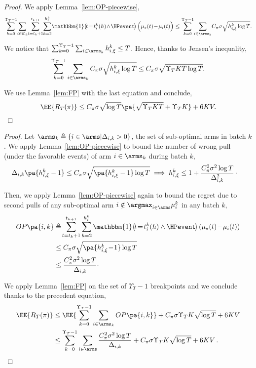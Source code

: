 \begin{tBox}\restapiecewisetheorem*
\end{tBox}
\begin{proof}

We apply Lemma~\ref{lem:OP-piecewise},
\[\sum_{k=0}^{\Upsilon_T-1} \! \sum_{i \in \mathcal{K}_{k}} \!\sum_{t=t_{k}+1}^{t_{k+1}} \! \sum_{h=2}^{h_{i}^{k}} \!\mathbbm{1}\!\left( \!t\!=\!t_{i}^{k}(h)\!\land\!\HPevent\!\right)\Big(\mu_{\star}(t)\!-\!\mu_{i}(t)\Big) \leq  \sum_{k=0}^{\Upsilon_T-1} \!\sum_{i\in\arms_k}\!  C_\pi \sigma \sqrt{h_{i,\xi}^k\log{T}} .\]

We notice that $ \sum_{k=0}^{\Upsilon_T -1}\sum_{i\in\arms_k} h_{i,\xi}^k\leq T$. Hence, thanks to Jensen's inequality, 
\[
\sum_{k=0}^{\Upsilon_T-1} \sum_{i\in\arms_k} C_\pi\sigma \sqrt{h_{i,\xi}^k\log{T}} \leq  C_\pi \sigma \sqrt{ \Upsilon_T K T\log{T}}.
\]

We use Lemma~\ref{lem:FP} with the last equation and conclude,
\[
\EE{R_T(\pi)} \leq C_\pi \sigma \sqrt{\log{T}} \pa{ \sqrt{\Upsilon_T KT} + \Upsilon_T K} + 6KV.
\]
\end{proof}
\begin{tBox}
\restapiecewisetheorempd*
\end{tBox}
\begin{proof}
Let $\arms_k \triangleq \left\{ i \in \arms | \Delta_{i,k} > 0\right\}$, the set of sub-optimal arms in batch $k$.
We apply Lemma~\ref{lem:OP-piecewise} to bound the number of wrong pull (under the favorable events) of arm $i\in \arms_k$ during batch $k$,
\begin{align*}
     \Delta_{i,k} \pa{h^k_{i, \xi} -1} & \leq C_\pi \sigma \sqrt{\pa{h_{i,\xi}^k-1}\log{T}} \implies h_{i,\xi}^k \leq 1 + \frac{C_\pi^2 \sigma^2\log{T}}{\Delta_{i,k}^2}\, \cdot
\end{align*}

Then, we apply Lemma~\ref{lem:OP-piecewise} again to bound the regret due to second pulls of any sub-optimal arm $i\notin \argmax_{i \in \arms} \mu_i^k$ in any batch $k$,
\begin{align*}
OP\pa{i,k} &\triangleq\! \sum_{t=t_{k}+1}^{t_{k+1}} \sum_{h=2}^{h_{i}^{k}} \mathbbm{1}\!\left(\! t\!=\!t_{i}^{k}(h) \land \HPevent \!\right)\left(\mu_{\star}(t)\!-\!\mu_{i}(t)\right) \\
&\leq C_\pi \sigma \sqrt{\pa{h_{i,\xi}^k \!-\! 1}\log{T}}\\
 &\leq \frac{C_\pi^2\sigma^2\log{T}}{\Delta_{i,k}}\cdot
 \end{align*}

We apply Lemma~\ref{lem:FP} on the set of $\Upsilon_T -1$ breakpoints and we conclude thanks to the precedent equation,
\begin{align*}
\EE{R_T(\pi)} & \leq \EE{\sum_{k=0}^{\Upsilon_T-1} \sum_{i\in\arms_k}OP\pa{i,k} }+ C_\pi \sigma \Upsilon_T K\sqrt{\log{T}} + 6KV  \\
&\leq \sum_{k=0}^{\Upsilon_T-1} \sum_{i\in\arms} \frac{C_\pi^2 \sigma^2\log{T}}{\Delta_{i,k}} +  C_\pi \sigma \Upsilon_T K \sqrt{ \log{T}} + 6KV\,.
\end{align*}
\end{proof}
